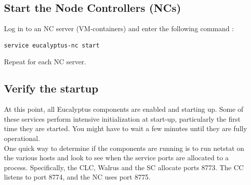 \subsection{Start the Node Controllers (NCs)}
Log in to an NC server (VM-containers) and enter the following command :
\begin{lstlisting}[language=bash]
service eucalyptus-nc start
\end{lstlisting}
Repeat for each NC server.
\subsection{Verify the startup}
At this point, all Eucalyptus components are enabled and starting up. Some of these services perform intensive initialization at start-up, particularly the first time they are started. You might have to wait a few minutes until they are fully operational.
\\ \linebreak
One quick way to determine if the components are running is to run netstat on the various hosts and look to see when the service ports are allocated to a process. Specifically, the CLC, Walrus and the SC allocate ports 8773. The CC listens to port 8774, and the NC uses port 8775.
